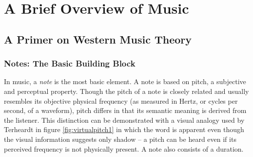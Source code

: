 \chapter{A Brief Overview of Music}

\section{A Primer on Western Music Theory}

\subsection{Notes: The Basic Building Block}

In music, a \textit{note} is the most basic element. A note is based on pitch, a subjective and perceptual property. Though the pitch of a note is closely related and usually resembles its objective physical frequency (as measured in Hertz, or cycles per second, of a waveform), pitch differs in that its semantic meaning is derived from the listener. This distinction can be demonstrated with a visual analogy used by Terheardt in figure \ref{fig:virtualpitch1} in which the word  is apparent even though the visual information suggests only shadow -- a pitch can be heard even if its perceived frequency is not physically present. A note also consists of a duration.